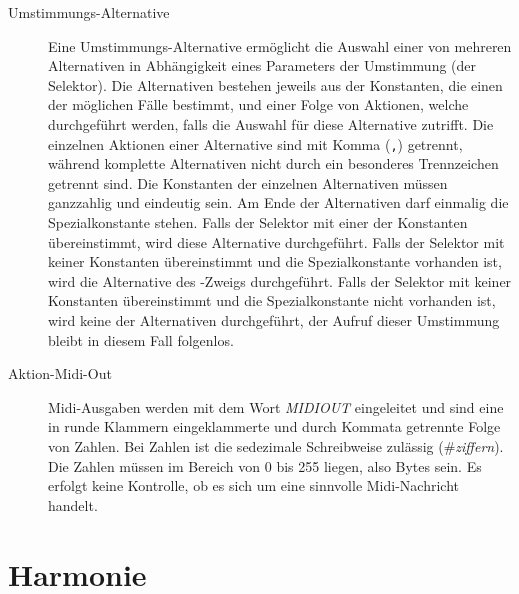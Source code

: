 \begin{description}
    \item[Umstimmungs-Alternative] Eine
      Umstimmungs-Alternative ermöglicht die Auswahl einer von
      mehreren Alternativen in Abhängigkeit eines
      Parameters der Umstimmung (der
      Selektor).  Die Alternativen bestehen jeweils
      aus der Konstanten, die einen der möglichen Fälle bestimmt, und
      einer Folge von Aktionen, welche durchgeführt werden, falls die
      Auswahl für diese Alternative zutrifft. Die einzelnen Aktionen
      einer Alternative sind mit Komma (\texttt{,}) getrennt, während
      komplette Alternativen nicht durch ein besonderes Trennzeichen
      getrennt sind. Die Konstanten der einzelnen Alternativen müssen
      ganzzahlig und eindeutig sein. Am Ende der Alternativen darf
      einmalig die Spezialkonstante 
      stehen. Falls der Selektor mit einer der Konstanten
      übereinstimmt, wird diese Alternative durchgeführt. Falls der
      Selektor mit keiner Konstanten übereinstimmt und die
      Spezialkonstante  vorhanden ist, wird die
      Alternative des -Zweigs durchgeführt. Falls der
      Selektor mit keiner Konstanten übereinstimmt und die
      Spezialkonstante  nicht vorhanden ist, wird keine
      der Alternativen durchgeführt, der Aufruf dieser Umstimmung
      bleibt in diesem Fall folgenlos.

      

      \item[Aktion-Midi-Out]
	Midi-Ausgaben werden mit dem Wort \emph{MIDIOUT}
	 eingeleitet und
sind eine in runde Klammern eingeklammerte
und durch Kommata getrennte Folge von Zahlen. Bei Zahlen ist die sedezimale
Schreibweise zulässig (\#\emph{ziffern}).\index{\#} Die Zahlen
müssen im Bereich von 0 bis 255 liegen, also Bytes sein. Es erfolgt keine
Kontrolle, ob es sich um eine sinnvolle Midi-Nachricht handelt.

      

\end{description}

\chapter{Harmonie}\label{cha:harmonie}

